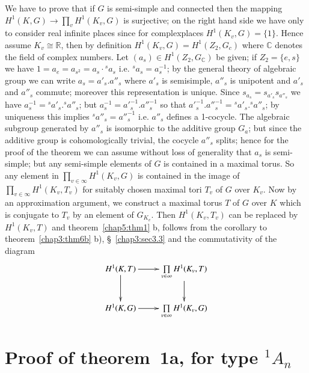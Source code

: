  We have to prove that if $G$ is semi-simple and connected then the
 mapping $H^1(K,G) \rightarrow \prod\limits_{v} H^1 (K_v, G)$ is
 surjective; on the right hand side we have only to consider real
 infinite places since 
 for complex\pageoriginale places $H^1(K_v,G)= \{1\}$. Hence assume
 $K_v \cong 
 \mathbb{R}$, then by  definition $H^1(K_v, G)=H^1(Z_2, G_c)$ where
 $\mathbb{C}$ denotes the field of complex numbers. Let $(a_s) \in
 H^1(Z_2, G_{\mathbb{C}})$ be given; if $Z_2= \{ e,s\}$ we have $1=
 a_e= a_{s^2}= a_s \cdot {}^sa_s$ i.e. ${}^sa_s = a^{-1}_s$; by the general
 theory of algebraic group we can write $a_s = a'_s. a''_s$ where
 $a'_s$ is semisimple, $a''_s$ is unipotent and $a'_s$ and $a''_s$
 commute; moreover this representation is unique. Since $s_{a_s}=
 s_{a'_s} s_{a''_s}$ we have $a^{-1}_s = {^sa'_s}. {^s a''_s}$; but
 $a^{-1}_s = a'^{-1}_s. a''^{-1}_s$ so that $a'^{-1}_s. a''^{-1}_s =
 {^sa'_s}.{^s a''_s}$; by uniqueness this implies $^sa''_s =
 a''^{-1}_s$ i.e. $ a''_s$ defines a 1-cocycle. The algebraic
 subgroup generated by $a''_s$ is isomorphic to the additive group
 $G_a$; but since the additive group is cohomologically trivial, the
 cocycle $a''_s$ splits; hence for the proof of the theorem we can
 assume without loss of generality that $a_s$ is semi-simple; but any
 semi-simple elements of $G$ is contained in a maximal torus. So any
 element in $\prod\limits_{v \in \infty} H^1(K_v,G)$ is contained in
 the image of $\prod\limits_{v \in \infty} H^1(K_v, T_v)$ for
 suitably chosen maximal tori $T_v$ of $G$ over $K_v$. Now by an
 approximation argument, we construct a maximal torus $T$ of $G$ over
 $K$ which is conjugate to $T_v$ by an element of $G_{K_v}$. Then
 $H^1(K_v, T_v)$ can be replaced by $H^1(K_v,T)$ and 
 theorem~\ref{chap5:thm1} b, 
 follows from the corollary to theorem~\ref{chap3:thm6b} b), 
\S~\ref{chap3:sec3.3} and the 
 commutativity of the diagram 
\[
\xymatrix{
H^1 (K,T) \ar[r] \ar[d] & \prod\limits_{v\in \infty} H^1 (K_v, T)
\ar[d]\\
H^1(K,G) \ar[r] & \prod\limits_{v\in\infty} H^1 (K_v,G)
}
\]
  
\section{Proof of theorem~1a, 
for type ${}^1 A_n$}\label{chap5:sec5.4}  
  
